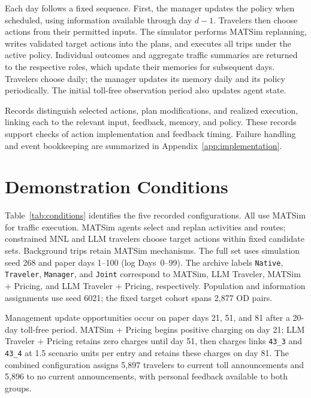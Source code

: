 Each day follows a fixed sequence. First, the manager updates the policy when scheduled, using information available through day $d-1$. Travelers then choose actions from their permitted inputs. The simulator performs MATSim replanning, writes validated target actions into the plans, and executes all trips under the active policy. Individual outcomes and aggregate traffic summaries are returned to the respective roles, which update their memories for subsequent days. Travelers choose daily; the manager updates its memory daily and its policy periodically. The initial toll-free observation period also updates agent state.

Records distinguish selected actions, plan modifications, and realized execution, linking each to the relevant input, feedback, memory, and policy. These records support checks of action implementation and feedback timing. Failure handling and event bookkeeping are summarized in Appendix~\ref{app:implementation}.

\section{Demonstration Conditions}
\label{app:demonstration}
\label{sec:experimental-design}
\label{sec:scenario-conditions}

Table~\ref{tab:conditions} identifies the five recorded configurations. All use MATSim for traffic execution. MATSim agents select and replan activities and routes; constrained MNL and LLM travelers choose target actions within fixed candidate sets. Background trips retain MATSim mechanisms. The full set uses simulation seed 268 and paper days 1--100 (log Days~0--99). The archive labels \texttt{Native}, \texttt{Traveler}, \texttt{Manager}, and \texttt{Joint} correspond to MATSim, LLM Traveler, MATSim + Pricing, and LLM Traveler + Pricing, respectively. Population and information assignments use seed 6021; the fixed target cohort spans 2,877 OD pairs.



Management update opportunities occur on paper days 21, 51, and 81 after a 20-day toll-free period. MATSim + Pricing begins positive charging on day 21; LLM Traveler + Pricing retains zero charges until day 51, then charges links \texttt{43\_3} and \texttt{43\_4} at 1.5 scenario units per entry and retains these charges on day 81. The combined configuration assigns 5,897 travelers to current toll announcements and 5,896 to no current announcements, with personal feedback available to both groups.

